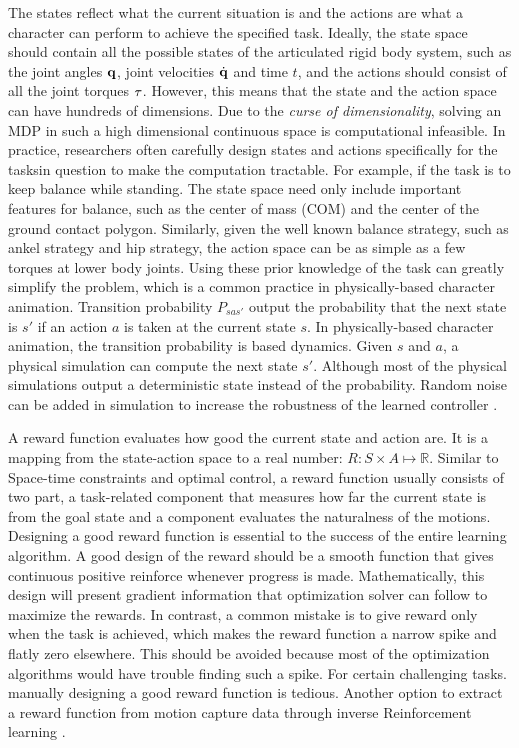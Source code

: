 The states reflect what the current situation is and the actions are what a character can perform to achieve the specified task. Ideally, the state space should contain all the possible states of the articulated rigid body system, such as the joint angles $\mathbf{q}$, joint velocities $\dot{\mathbf{q}}$ and time $t$, and the actions should consist of all the joint torques $\mathbf{\tau}$. However, this means that the state and the action space can have hundreds of dimensions. Due to the \emph{curse of dimensionality}, solving an MDP in such a high dimensional continuous space is computational infeasible. In practice, researchers often carefully design states and actions specifically for the tasksin question to make the computation tractable. For example, if the task is to keep balance while standing. The state space need only include important features for balance, such as the center of mass (COM) and the center of the ground contact polygon. Similarly, given the well known balance strategy, such as ankel strategy and hip strategy, the action space can be as simple as a few torques at lower body joints. Using these prior knowledge of the task can greatly simplify the problem, which is a common practice in physically-based character animation. Transition probability $P_{sas'}$ output the probability that the next state is $s'$ if an action $a$ is taken at the current state $s$. In physically-based character animation, the transition probability is based dynamics. Given $s$ and $a$, a physical simulation can compute the next state $s'$. Although most of the physical simulations output a deterministic state instead of the probability. Random noise can be added in simulation to increase the robustness of the learned controller \cite{Wang:2010}.

A reward function evaluates how good the current state and action are. It is a mapping from the state-action space to a real number: $R: S\times A\mapsto \mathbb{R}$. Similar to Space-time constraints and optimal control, a reward function usually consists of two part, a task-related component that measures how far the current state is from the goal state and a component evaluates the naturalness of the motions. Designing a good reward function is essential to the success of the entire learning algorithm. A good design of the reward should be a smooth function that gives continuous positive reinforce whenever progress is made. Mathematically, this design will present gradient information that optimization solver can follow to maximize the rewards. In contrast, a common mistake is to give reward only when the task is achieved, which makes the reward function a narrow spike and flatly zero elsewhere. This should be avoided because most of the optimization algorithms would have trouble finding such a spike. For certain challenging tasks. manually designing a good reward function is tedious. Another option to extract a reward function from motion capture data through inverse Reinforcement learning \cite{Ng:2000}.


